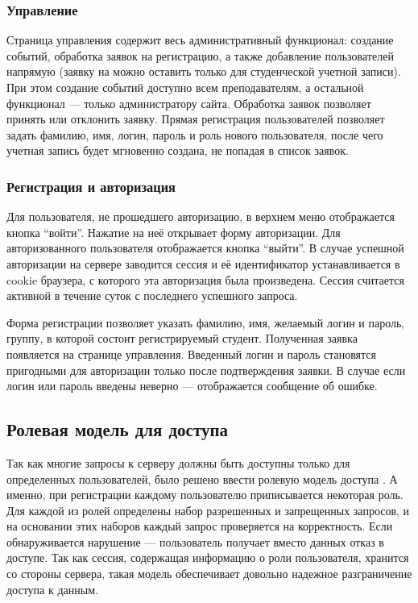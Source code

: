 \documentclass[14pt]{extarticle}
\begin{document}
\subsubsection{Управление}
Страница управления содержит весь административный функционал: создание событий, обработка заявок на регистрацию, а также добавление пользователей напрямую (заявку на можно оставить только для студенческой учетной записи). При этом создание событий доступно всем преподавателям, а остальной функционал --- только администратору сайта. Обработка заявок позволяет принять или отклонить заявку. Прямая регистрация пользователей позволяет задать фамилию, имя, логин, пароль и роль нового пользователя, после чего учетная запись будет мгновенно создана, не попадая в список заявок.

\subsubsection{Регистрация и авторизация}
Для пользователя, не прошедшего авторизацию, в верхнем меню отображается кнопка \enquote{войти}. Нажатие на неё открывает форму авторизации. Для авторизованного пользователя отображается кнопка \enquote{выйти}. В случае успешной авторизации на сервере заводится сессия и её идентификатор устанавливается в cookie браузера, с которого эта авторизация была произведена. Сессия считается активной в течение суток с последнего успешного запроса.

Форма регистрации позволяет указать фамилию, имя, желаемый логин и пароль, группу, в которой состоит регистрируемый студент. Полученная заявка появляется на странице управления. Введенный логин и пароль становятся пригодными для авторизации только после подтверждения заявки. В случае если логин или пароль введены неверно --- отображается сообщение об ошибке. 

\subsection{Ролевая модель для доступа}
Так как многие запросы к серверу должны быть доступны только для определенных пользователей, было решено ввести ролевую модель доступа \cite{rbac}. А именно, при регистрации каждому пользователю приписывается некоторая роль. Для каждой из ролей определены набор разрешенных и запрещенных запросов, и на основании этих наборов каждый запрос проверяется на корректность. Если обнаруживается нарушение --- пользователь получает вместо данных отказ в доступе. Так как сессия, содержащая информацию о роли пользователя, хранится со стороны сервера, такая модель обеспечивает довольно надежное разграничение доступа к данным.
\end{document}
